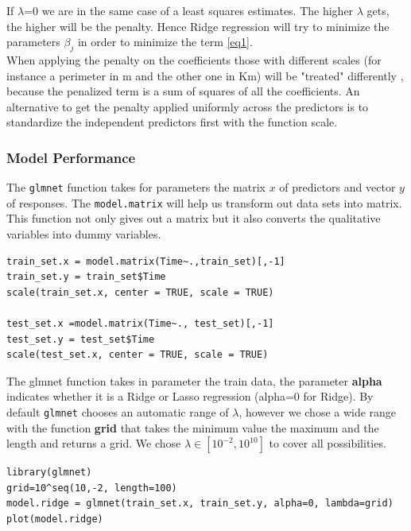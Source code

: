 \documentclass[]{report}
\begin{document}
If $\lambda$=0 we are in the same case of a least squares estimates. The higher $\lambda$ gets, the higher will be the penalty. Hence Ridge regression will try to minimize the parameters $\beta_{j}$ in order to minimize the term \ref{eq1}.\\
When applying the penalty on the coefficients those with different scales (for instance a perimeter in m and the other one in Km) will be "treated" differently , because the penalized term is a sum of squares of all the coefficients. An alternative to get the penalty applied uniformly across the predictors is to standardize the independent predictors first with the function scale.

\subsubsection{Model Performance}
The \texttt{glmnet} function takes for parameters the matrix $x$ of predictors and vector $y$ of responses. The \texttt{model.matrix} will help us transform out data sets into matrix. This function not only gives out a matrix but it also converts the qualitative variables into dummy variables.
\begin{lstlisting}
train_set.x = model.matrix(Time~.,train_set)[,-1] 
train_set.y = train_set$Time
scale(train_set.x, center = TRUE, scale = TRUE)

test_set.x =model.matrix(Time~., test_set)[,-1]
test_set.y = test_set$Time
scale(test_set.x, center = TRUE, scale = TRUE)
\end{lstlisting}
The glmnet function takes in parameter the train data, the parameter \textbf{alpha} indicates whether it is a Ridge or Lasso regression (alpha=0 for Ridge). By default \texttt{glmnet} chooses an automatic range of $\lambda$, however we chose a wide range with the function \textbf{grid} that takes the minimum value the maximum and the length and returns a grid. We chose $\lambda\in[10^{−2},10^{10}]$ to cover all possibilities.

\begin{lstlisting}
library(glmnet)
grid=10^seq(10,-2, length=100)
model.ridge = glmnet(train_set.x, train_set.y, alpha=0, lambda=grid)
plot(model.ridge)
\end{lstlisting}
\end{document}
